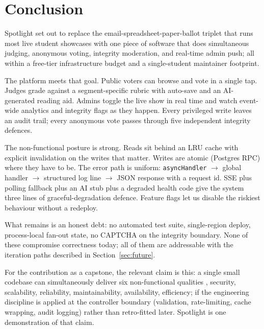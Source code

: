 \section{Conclusion}
\label{sec:conclusion}

Spotlight set out to replace the email-spreadsheet-paper-ballot triplet
that runs most live student showcases with one piece of software that
does simultaneous judging, anonymous voting, integrity moderation, and
real-time admin push; all within a free-tier infrastructure budget
and a single-student maintainer footprint.

The platform meets that goal. Public voters can browse and vote in a
single tap. Judges grade against a segment-specific rubric with auto-save
and an AI-generated reading aid. Admins toggle the live show in real
time and watch event-wide analytics and integrity flags as they happen.
Every privileged write leaves an audit trail; every anonymous vote
passes through five independent integrity defences.

The non-functional posture is strong. Reads sit behind an LRU cache with
explicit invalidation on the writes that matter. Writes are atomic
(Postgres RPC) where they have to be. The error path is uniform:
\texttt{asyncHandler} $\to$ global handler $\to$ structured log line $\to$
JSON response with a request id. SSE plus polling fallback plus an AI
stub plus a degraded health code give the system three lines of
graceful-degradation defence. Feature flags let us disable the riskiest
behaviour without a redeploy.

What remains is an honest debt: no automated test suite, single-region
deploy, process-local fan-out state, no CAPTCHA on the integrity
boundary. None of these compromise correctness today; all of them are
addressable with the iteration paths described in
Section~\ref{sec:future}.

For the contribution as a capstone, the relevant claim is this: a single
small codebase can simultaneously deliver six non-functional qualities
, security, scalability, reliability, maintainability, availability,
efficiency; if the engineering discipline is applied at the
controller boundary (validation, rate-limiting, cache wrapping, audit
logging) rather than retro-fitted later. Spotlight is one demonstration
of that claim.
